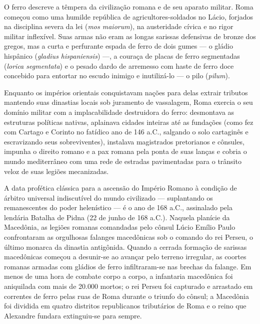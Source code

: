 \documentclass[11pt,a4paper,openany]{book}
\begin{document}
O ferro descreve a têmpera da civilização romana e de seu aparato militar. Roma começou como uma humilde república de agricultores-soldados no Lácio, forjados na disciplina severa da lei (\textit{mos maiorum}), na austeridade cívica e no rigor militar inflexível. Suas armas não eram as longas sarissas defensivas de bronze dos gregos, mas a curta e perfurante espada de ferro de dois gumes — o gládio hispânico (\textit{gladius hispaniensis}) —, a couraça de placas de ferro segmentadas (\textit{lorica segmentata}) e o pesado dardo de arremesso com haste de ferro doce concebido para entortar no escudo inimigo e inutilizá-lo — o pilo (\textit{pilum}).

Enquanto os impérios orientais conquistavam nações para delas extrair tributos mantendo suas dinastias locais sob juramento de vassalagem, Roma exercia o seu domínio militar com a implacabilidade destruidora do ferro: desmontava as estruturas políticas nativas, aplainava cidades inteiras até as fundações (como fez com Cartago e Corinto no fatídico ano de 146 a.C., salgando o solo cartaginês e escravizando seus sobreviventes), instalava magistrados pretorianos e cônsules, impunha o direito romano e a pax romana pela ponta de suas lanças e cobria o mundo mediterrâneo com uma rede de estradas pavimentadas para o trânsito veloz de suas legiões mecanizadas.

A data profética clássica para a ascensão do Império Romano à condição de árbitro universal indiscutível do mundo civilizado — suplantando os remanescentes do poder helenístico — é o ano de 168 a.C., assinalado pela lendária Batalha de Pidna (22 de junho de 168 a.C.). Naquela planície da Macedônia, as legiões romanas comandadas pelo cônsul Lúcio Emílio Paulo confrontaram as orgulhosas falanges macedônicas sob o comando do rei Perseu, o último monarca da dinastia antigônida. Quando a cerrada formação de sarissas macedônicas começou a desunir-se ao avançar pelo terreno irregular, as coortes romanas armadas com gládios de ferro infiltraram-se nas brechas da falange. Em menos de uma hora de combate corpo a corpo, a infantaria macedônica foi aniquilada com mais de 20.000 mortos; o rei Perseu foi capturado e arrastado em correntes de ferro pelas ruas de Roma durante o triunfo do cônsul; a Macedônia foi dividida em quatro distritos republicanos tributários de Roma e o reino que Alexandre fundara extinguiu-se para sempre.
\end{document}

